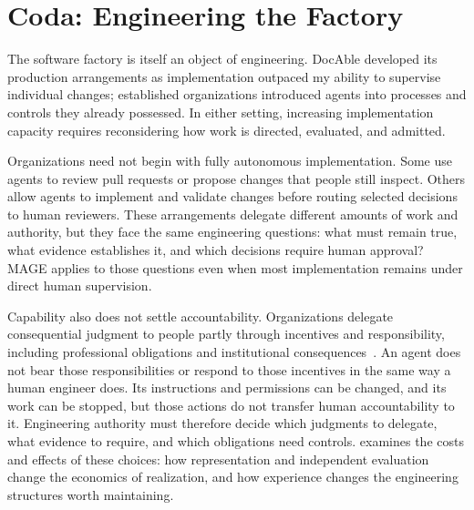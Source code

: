 



\chapter{Coda: Engineering the Factory}


The software factory is itself an object of engineering. DocAble developed its production arrangements as implementation outpaced my ability to supervise individual changes; established organizations introduced agents into processes and controls they already possessed. In either setting, increasing implementation capacity requires reconsidering how work is directed, evaluated, and admitted.

Organizations need not begin with fully autonomous implementation. Some use agents to review pull requests or propose changes that people still inspect. Others allow agents to implement and validate changes before routing selected decisions to human reviewers. These arrangements delegate different amounts of work and authority, but they face the same engineering questions: what must remain true, what evidence establishes it, and which decisions require human approval? MAGE applies to those questions even when most implementation remains under direct human supervision.


Capability also does not settle accountability. Organizations delegate consequential judgment to people partly through incentives and responsibility, including professional obligations and institutional consequences~\citep{marchsimon1958}. An agent does not bear those responsibilities or respond to those incentives in the same way a human engineer does. Its instructions and permissions can be changed, and its work can be stopped, but those actions do not transfer human accountability to it. Engineering authority must therefore decide which judgments to delegate, what evidence to require, and which obligations need controls.  examines the costs and effects of these choices: how representation and independent evaluation change the economics of realization, and how experience changes the engineering structures worth maintaining.
